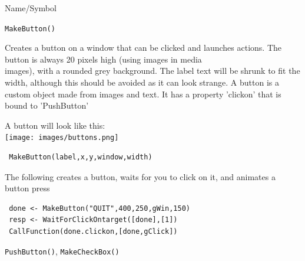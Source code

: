 \begin{desc}{Name/Symbol}
\item[Name/Symbol]  	\verb+MakeButton()+

\item[Description]	
Creates a button on a window that can be clicked and launches actions. The button is always 20 pixels high (using images in media\\images), with a rounded grey background.  The label text will be shrunk to fit the width, although this should be avoided as it can look strange.
A button is a custom object made from images and text. It has a property 'clickon' that is bound to 'PushButton'

A button will look like this:\\
 \texttt{[image: images/buttons.png]}

\item[Usage]
\begin{verbatim}
 MakeButton(label,x,y,window,width)
 \end{verbatim}

\item[Example]      	
The following creates a button, waits for you to click on it, and animates a button press

\begin{verbatim}
 done <- MakeButton("QUIT",400,250,gWin,150)
 resp <- WaitForClickOntarget([done],[1])
 CallFunction(done.clickon,[done,gClick]) 

\end{verbatim}

\item[See Also]	\verb+PushButton()+, \verb+MakeCheckBox()+
\end{desc}




